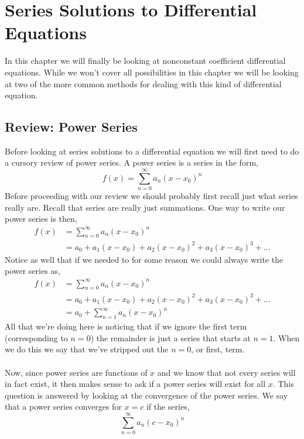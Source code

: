 \documentclass[10pt,reqno]{book}
\theoremstyle{definition}
\begin{document}
	\chapter{Series Solutions to Differential Equations}
	
	In this chapter we will finally be looking at nonconstant coefficient differential equations.  While we won’t cover all possibilities in this chapter we will be looking at two of the more common methods for dealing with this kind of differential equation.
	
	\section{Review: Power Series}
	Before looking at series solutions to a differential equation we will first need to do a cursory review of power series.  A power series is a series in the form,
	\begin{equation}
	f(x) = \sum_{n = 0}^{\infty} a_n (x - x_0)^n
	\end{equation}
	Before proceeding with our review we should probably first recall just what series really are. Recall that series are really just summations. One way to write our power series is then,
	\begin{align*}
	f(x) &= \sum_{n = 0}^{\infty} a_n (x - x_0)^n\\
	&= a_0 + a_1(x-x_0) + a_2(x-x_0)^2 + a_3(x-x_0)^3 + \dots
	\end{align*}
	Notice as well that if we needed to for some reason we could always write the power series as,
	\begin{align*}
	f(x) &= \sum_{n = 0}^{\infty} a_n (x - x_0)^n\\
	&= a_0 + a_1(x-x_0) + a_2(x-x_0)^2 + a_3(x-x_0)^3 + \dots\\
	&= a_0 + \sum_{n = 1}^{\infty} a_n (x - x_0)^n
	\end{align*}
	All that we’re doing here is noticing that if we ignore the first term (corresponding to $ n = 0 $) the remainder is just a series that starts at $ n = 1 $. When we do this we say that we've stripped out the $ n = 0 $, or first, term.\\ \\
	Now, since power series are functions of $ x $ and we know that not every series will in fact exist, it then makes sense to ask if a power series will exist for all $ x $. This question is answered by looking at the convergence of the power series. We say that a power series converges for $ x = c $ if the series,
	\[ \sum_{n = 0}^{\infty} a_n(c - x_0)^n \]
\end{document}

